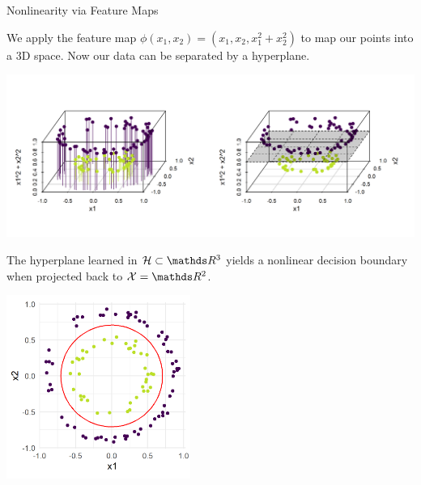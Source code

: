 \begin{vbframe}{Nonlinearity via Feature Maps}
\framebreak

\vspace*{0.5cm} 

We apply the feature map $\phi(x_1, x_2) = (x_1, x_2, x_1^2+x_2^2)$ to map our points into a 3D space. Now our data can be separated by a hyperplane.


\begin{center}
  \includegraphics{figure/circles_feature_map.png}
\end{center}

\framebreak 

The hyperplane learned in $\HS \subset \R^3$ yields a nonlinear decision boundary when projected back to $\Xspace  = \R^2$.

\begin{center}
\includegraphics[width=6cm]{figure/circles_boundary.png}
\end{center}

\end{vbframe}



